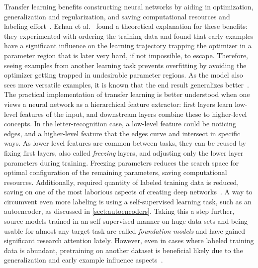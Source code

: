 \documentclass[english,twoside,openright]{UH_DS_MSc}
\begin{document}
Transfer learning benefits constructing neural networks 
by aiding in optimization, generalization and regularization, and saving computational resources and labeling effort~\cite{erhanWhyDoesUnsupervised2010, transferlearning_survey}.
Erhan et al.~\cite{erhanWhyDoesUnsupervised2010} found a theoretical explanation for these benefits: they
experimented with ordering the training data and found 
that early examples have a significant influence on the learning trajectory trapping the optimizer in a parameter region that is later very hard, 
if not impossible, to escape. Therefore, seeing examples from another learning task prevents overfitting by avoiding the optimizer getting trapped in undesirable parameter regions. As the model also sees more versatile examples, it is known that the end result generalizes better~\cite{transferlearning_survey}.
The practical implementation of transfer learning is better understood when one views a neural network as a hierarchical feature extractor:
first layers learn low-level features of the input, and downstream layers combine these to higher-level concepts.
In the letter-recognition case, a low-level feature could be noticing edges, and a higher-level feature that the edges curve and intersect in 
specific ways. As lower level features are common between tasks, they can be reused by fixing first layers, also called \textit{freezing} layers,
and adjusting only the lower layer parameters during training.
Freezing parameters reduces the search space for optimal configuration of the remaining parameters, saving computational resources. Additionally, required quantity of labeled training data is reduced, saving on one of the most laborious aspects of creating deep networks~\cite{engbook}.
A way to circumvent even more labeling is using a self-supervised learning task, such as an autoencoder, as discussed in \ref{sect:autoencoders}. Taking this a step further, source models trained in an self-supervised manner on huge data sets and being usable for almost any target task are called \textit{foundation models} and have gained significant research attention lately. However, even in cases where labeled training data is abundant, pretraining on another dataset is beneficial likely due to the generalization and early example influence aspects~\cite{erhanWhyDoesUnsupervised2010}.
\end{document}
